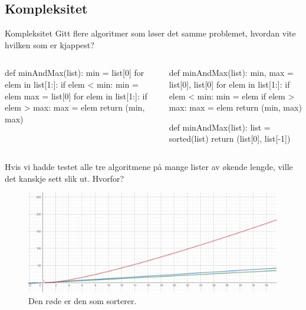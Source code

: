 \subsection{Kompleksitet}
\begin{frame}[fragile]{Kompleksitet}
    Gitt flere algoritmer som løser det samme problemet, hvordan vite hvilken som er kjappest?
    \begin{columns}
        \begin{column}{0.45\textwidth}
            \begin{python}
def minAndMax(list):
    min = list[0]
    for elem in list[1:]:
        if elem < min:
            min = elem
    max = list[0]
    for elem in list[1:]:
        if elem > max:
            max = elem
    return (min, max)
            \end{python}
        \end{column}
        \pause
        \begin{column}{0.45\textwidth}
            \begin{python}
def minAndMax(list):
    min, max = list[0], list[0]
    for elem in list[1:]:
        if elem < min: 
            min = elem
        if elem > max: 
            max = elem
    return (min, max)
    
def minAndMax(list):
    list = sorted(list)
    return (list[0], list[-1])
            \end{python}
        \end{column}
    \end{columns}    
\end{frame}
\begin{frame}[fragile]{}
    Hvis vi hadde testet alle tre algoritmene på mange lister av økende lengde, ville det kanskje sett slik ut. Hvorfor?
    \begin{figure}
        \centering
        \includegraphics[height = 4.5cm]{images/minmax.png}
        \caption{Den røde er den som sorterer.}
        \label{fig:minmax}
    \end{figure}    
\end{frame}

